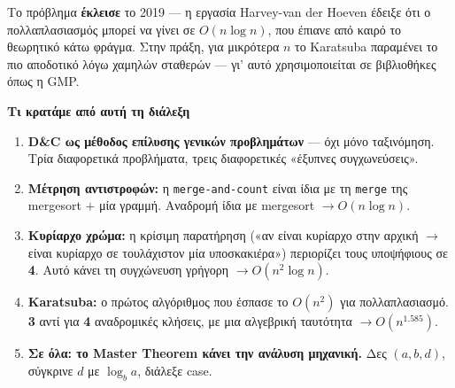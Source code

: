 \documentclass[11pt,a4paper]{article}
\begin{document}
Το πρόβλημα \textbf{έκλεισε} το 2019 --- η εργασία Harvey-van der Hoeven έδειξε
ότι ο πολλαπλασιασμός μπορεί να γίνει σε $O(n \log n)$, που έπιανε από καιρό το
θεωρητικό κάτω φράγμα. Στην πράξη, για μικρότερα $n$ το Karatsuba παραμένει το
πιο αποδοτικό λόγω χαμηλών σταθερών --- γι' αυτό χρησιμοποιείται σε βιβλιοθήκες
όπως η GMP.

\begin{recapbox}
\textbf{Τι κρατάμε από αυτή τη διάλεξη}
\begin{enumerate}
  \item \textbf{D\&C ως μέθοδος επίλυσης γενικών προβλημάτων} --- όχι μόνο
  ταξινόμηση. Τρία διαφορετικά προβλήματα, τρεις διαφορετικές «έξυπνες
  συγχωνεύσεις».
  \item \textbf{Μέτρηση αντιστροφών:} η \texttt{merge-and-count} είναι ίδια με
  τη \texttt{merge} της mergesort $+$ μία γραμμή. Αναδρομή ίδια με mergesort
  $\to O(n \log n)$.
  \item \textbf{Κυρίαρχο χρώμα:} η κρίσιμη παρατήρηση («αν είναι κυρίαρχο στην
  αρχική $\to$ είναι κυρίαρχο σε τουλάχιστον μία υποσκακιέρα») περιορίζει τους
  υποψήφιους σε \textbf{4}. Αυτό κάνει τη συγχώνευση γρήγορη $\to O(n^2 \log n)$.
  \item \textbf{Karatsuba:} ο πρώτος αλγόριθμος που έσπασε το $O(n^2)$ για
  πολλαπλασιασμό. \textbf{3} αντί για \textbf{4} αναδρομικές κλήσεις, με μια
  αλγεβρική ταυτότητα $\to O(n^{1.585})$.
  \item \textbf{Σε όλα: το Master Theorem κάνει την ανάλυση μηχανική.} Δες
  $(a, b, d)$, σύγκρινε $d$ με $\log_b a$, διάλεξε case.
\end{enumerate}
\end{recapbox}

\lecturefooter
\end{document}
